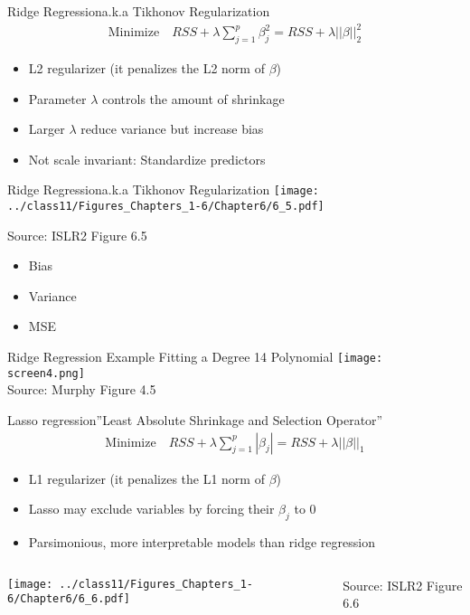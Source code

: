 \documentclass[ignorenonframetext,xcolor=x11names]{beamer}
\begin{document}
\begin{frame}{Ridge Regression}{a.k.a Tikhonov Regularization}
\begin{align*}
\text{Minimize} \quad RSS + \lambda \sum_{j=1}^p \beta_j^2 = RSS + \lambda ||\beta||_2^2
\end{align*}
\begin{itemize}
   \item L2 regularizer (it penalizes the L2 norm of $\beta$)
   \item Parameter $\lambda$ controls the amount of shrinkage
   \item Larger $\lambda$ reduce variance but increase bias
   \item Not scale invariant: Standardize predictors
\end{itemize}
\end{frame}

\begin{frame}{Ridge Regression}{a.k.a Tikhonov Regularization}
\texttt{[image: ../class11/Figures\_Chapters\_1-6/Chapter6/6\_5.pdf]}

\scriptsize Source: ISLR2 Figure 6.5 \normalsize \\

\begin{itemize}
  \item Bias
  \item \color{teal}Variance
  \item \color{magenta}MSE
\end{itemize}

\end{frame}

\begin{frame}{Ridge Regression Example }{Fitting a Degree 14 Polynomial}
\centering
\texttt{[image: screen4.png]}\\
\scriptsize Source: Murphy Figure 4.5
\end{frame}

\begin{frame}{Lasso regression}{''Least Absolute Shrinkage and Selection Operator''}
\begin{align*}
\text{Minimize} \quad RSS + \lambda \sum_{j=1}^p |\beta_j| = RSS + \lambda ||\beta||_1
\end{align*}
\begin{itemize}
   \item L1 regularizer (it penalizes the L1 norm of $\beta$)
   \item Lasso may exclude variables by forcing their $\beta_j$ to 0
   \item Parsimonious, more interpretable models than ridge regression
\end{itemize}
\begin{columns}
\begin{column}{0.8\textwidth}
\texttt{[image: ../class11/Figures\_Chapters\_1-6/Chapter6/6\_6.pdf]}
\end{column}
\begin{column}{0.2\textwidth}
\scriptsize Source: ISLR2 Figure 6.6
\end{column}
\end{columns}
\end{frame}
\end{document}
